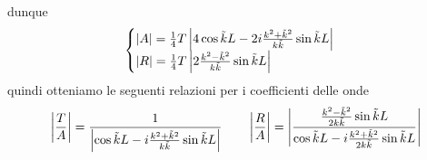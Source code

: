 \documentclass{article}
\begin{document}
dunque
\begin{gather}
    \begin{cases}
        |A| = \frac{1}{4}T\left| 4\cos \tilde{k}L - 2i\frac{k^2 + \tilde{k}^2}{k\tilde{k}}\sin \tilde{k} L \right| \\
        |R| = \frac{1}{4}T\left| 2\frac{k^2 - \tilde{k}^2}{k\tilde{k}}\sin \tilde{k}L \right|
    \end{cases} \notag
\end{gather}
quindi otteniamo le seguenti relazioni per i coefficienti delle onde
\begin{gather}
    \left| \frac{T}{A} \right| = \frac{1}{\left| \cos \tilde{k}L - i\frac{k^2 + \tilde{k}^2}{k\tilde{k}}\sin \tilde{k}L \right|} \qquad
    \left| \frac{R}{A} \right| = \left| \frac{\frac{k^2 - \tilde{k}^2}{2k\tilde{k}}\sin \tilde{k}L}{\cos \tilde{k}L - i\frac{k^2 + \tilde{k}^2}{2k\tilde{k}}\sin \tilde{k}L} \right| \notag
\end{gather} 
\end{document}
